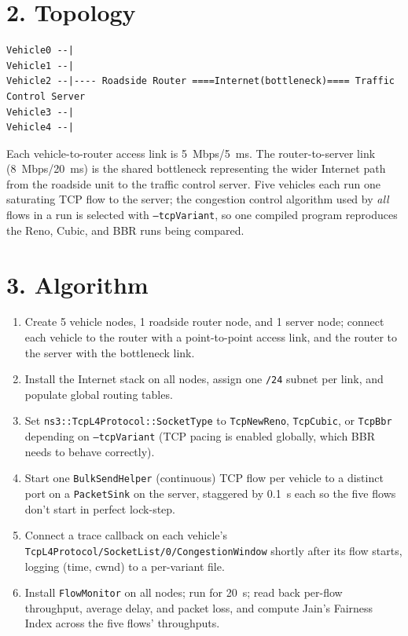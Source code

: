 \documentclass[11pt]{article}
\begin{document}
\section*{2. Topology}
\begin{center}
\begin{verbatim}
Vehicle0 --|
Vehicle1 --|
Vehicle2 --|---- Roadside Router ====Internet(bottleneck)==== Traffic Control Server
Vehicle3 --|
Vehicle4 --|
\end{verbatim}
\end{center}
Each vehicle-to-router access link is 5~Mbps/5~ms. The router-to-server link
(8~Mbps/20~ms) is the shared bottleneck representing the wider Internet path
from the roadside unit to the traffic control server. Five vehicles each run
one saturating TCP flow to the server; the congestion control algorithm used
by \emph{all} flows in a run is selected with \texttt{--tcpVariant}, so one
compiled program reproduces the Reno, Cubic, and BBR runs being compared.

\section*{3. Algorithm}
\begin{enumerate}
  \item Create 5 vehicle nodes, 1 roadside router node, and 1 server node;
        connect each vehicle to the router with a point-to-point access link,
        and the router to the server with the bottleneck link.
  \item Install the Internet stack on all nodes, assign one \texttt{/24}
        subnet per link, and populate global routing tables.
  \item Set \texttt{ns3::TcpL4Protocol::SocketType} to
        \texttt{TcpNewReno}, \texttt{TcpCubic}, or \texttt{TcpBbr} depending
        on \texttt{--tcpVariant} (TCP pacing is enabled globally, which BBR
        needs to behave correctly).
  \item Start one \texttt{BulkSendHelper} (continuous) TCP flow per vehicle to
        a distinct port on a \texttt{PacketSink} on the server, staggered by
        0.1~s each so the five flows don't start in perfect lock-step.
  \item Connect a trace callback on each vehicle's
        \texttt{TcpL4Protocol/SocketList/0/CongestionWindow} shortly after
        its flow starts, logging (time, cwnd) to a per-variant file.
  \item Install \texttt{FlowMonitor} on all nodes; run for 20~s; read back
        per-flow throughput, average delay, and packet loss, and compute
        Jain's Fairness Index across the five flows' throughputs.
\end{enumerate}
\end{document}
